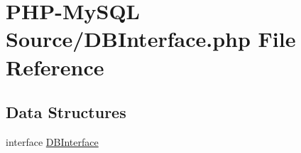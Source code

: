 \hypertarget{_d_b_interface_8php}{}\section{P\+H\+P-\/\+My\+S\+QL Source/\+D\+B\+Interface.php File Reference}
\label{_d_b_interface_8php}
\subsection*{Data Structures}
\begin{DoxyCompactItemize}
\item 
interface \hyperlink{interface_d_b_interface}{D\+B\+Interface}
\end{DoxyCompactItemize}
